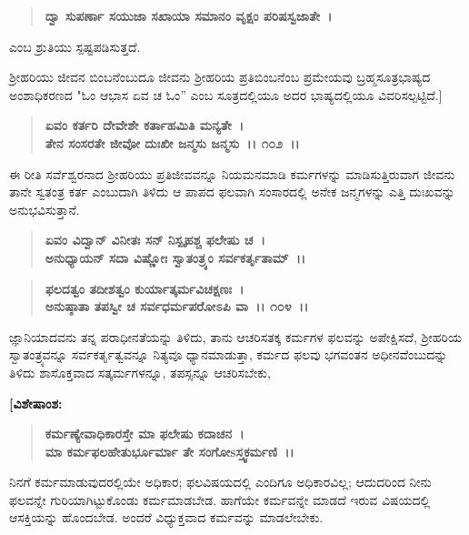 \begin{verse}
\textbf{ದ್ವಾ ಸುಪರ್ಣಾ ಸಯುಜಾ ಸಖಾಯಾ ಸಮಾನಂ ವೃಕ್ಷಂ ಪರಿಷಸ್ವಜಾತೇ~।}
\end{verse}

\noindent
ಎಂಬ ಶ್ರುತಿಯು ಸ್ಪಷ್ಟಪಡಿಸುತ್ತದೆ.

ಶ‍್ರೀಹರಿಯು ಜೀವನ ಬಿಂಬನೆಂಬುದೂ ಜೀವನು ಶ‍್ರೀಹರಿಯ ಪ್ರತಿಬಿಂಬನೆಂಬ ಪ್ರಮೇಯವು ಬ್ರಹ್ಮಸೂತ್ರಭಾಷ್ಯದ ಅಂಶಾಧಿಕರಣದ "ಓಂ ಆಭಾಸ ಏವ ಚ ಓಂ” ಎಂಬ ಸೂತ್ರದಲ್ಲಿಯೂ ಅದರ ಭಾಷ್ಯದಲ್ಲಿಯೂ ವಿವರಿಸಲ್ಪಟ್ಟಿದೆ.]

\begin{verse}
\textbf{ಏವಂ ಕರ್ತರಿ ದೇವೇಶೇ ಕರ್ತಾಹಮಿತಿ ಮನ್ಯತೇ~।}\\\textbf{ತೇನ ಸಂಸರತೇ ಜೀವೋ ದುಃಖೀ ಜನ್ಮಸು ಜನ್ಮಸು~।। ೧೦೨~।।}
\end{verse}

ಈ ರೀತಿ ಸರ್ವೆಶ್ವರನಾದ ಶ‍್ರೀಹರಿಯು ಪ್ರತಿಜೀವವನ್ನೂ ನಿಯಮನಮಾಡಿ ಕರ್ಮಗಳನ್ನು ಮಾಡಿಸುತ್ತಿರುವಾಗ ಜೀವನು ತಾನೇ ಸ್ವತಂತ್ರ ಕರ್ತ ಎಂಬುದಾಗಿ ತಿಳಿದು ಆ ಪಾಪದ ಫಲವಾಗಿ ಸಂಸಾರದಲ್ಲಿ ಅನೇಕ ಜನ್ಮಗಳನ್ನು ಎತ್ತಿ ದುಃಖವನ್ನು ಅನುಭವಿಸುತ್ತಾನೆ.

\begin{verse}
\textbf{ಏವಂ ವಿದ್ವಾನ್ ವಿನೀತಃ ಸನ್ ನಿಸ್ಪೃಹಶ್ಚ ಫಲೇಷು ಚ~।}\\\textbf{ಅನುಧ್ಯಾಯನ್ ಸದಾ ವಿಷ್ಣೋಃ ಸ್ವಾತಂತ್ರ್ಯಂ ಸರ್ವಕರ್ತೃತಾಮ್~।। }
\end{verse}

\begin{verse}
\textbf{ಫಲದತ್ವಂ ತದೀಶತ್ವಂ ಕುರ್ಯಾತ್ಕರ್ಮವಿಚಕ್ಷಣಃ~।}\\\textbf{ಅನುಷ್ಠಾತಾ ತಪಸ್ವೀ ಚ ಸರ್ವಧರ್ಮಪರೋಽಪಿ ವಾ~।। ೧೦೪~।।}
\end{verse}

ಜ್ಞಾನಿಯಾದವನು ತನ್ನ ಪರಾಧೀನತೆಯನ್ನು ತಿಳಿದು, ತಾನು ಆಚರಿಸತಕ್ಕ ಕರ್ಮಗಳ ಫಲವನ್ನು ಅಪೇಕ್ಷಿಸದೆ, ಶ‍್ರೀಹರಿಯ ಸ್ವಾತಂತ್ರ್ಯವನ್ನೂ ಸರ್ವಕರ್ತೃತ್ವವನ್ನೂ ನಿತ್ಯವೂ ಧ್ಯಾನಮಾಡುತ್ತಾ, ಕರ್ಮದ ಫಲವು ಭಗವಂತನ ಅಧೀನವೆಂಬುದನ್ನು ತಿಳಿದು ಶಾಸೊಕ್ತವಾದ ಸತ್ಕರ್ಮಗಳನ್ನೂ, ತಪಸ್ಸನ್ನೂ ಆಚರಿಸಬೇಕು,

\begin{flushleft}
\textbf{[ವಿಶೇಷಾಂಶ:}
\end{flushleft}

\begin{verse}
\textbf{ಕರ್ಮಣ್ಯೇವಾಧಿಕಾರಸ್ತೇ ಮಾ ಫಲೇಷು ಕದಾಚನ~।}\\\textbf{ಮಾ ಕರ್ಮಫಲಹೇತುರ್ಭೂರ್ಮಾ ತೇ ಸಂಗೋsಸ್ತ್ವಕರ್ಮಣಿ~।।} 
\end{verse}

ನಿನಗೆ ಕರ್ಮಮಾಡುವುದರಲ್ಲಿಯೇ ಅಧಿಕಾರ; ಫಲವಿಷಯದಲ್ಲಿ ಎಂದಿಗೂ ಅಧಿಕಾರವಿಲ್ಲ; ಆದುದರಿಂದ ನೀನು ಫಲವನ್ನೇ ಗುರಿಯಾಗಿಟ್ಟುಕೊಂಡು ಕರ್ಮಮಾಡಬೇಡ. ಹಾಗೆಯೇ ಕರ್ಮವನ್ನೇ ಮಾಡದೆ ಇರುವ ವಿಷಯದಲ್ಲಿ ಆಸಕ್ತಿಯನ್ನು ಹೊಂದಬೇಡ. ಅಂದರೆ ವಿಧ್ಯುಕ್ತವಾದ ಕರ್ಮವನ್ನು ಮಾಡಲೇಬೇಕು.

